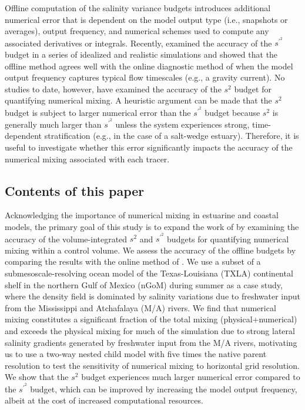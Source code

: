 \documentclass[draft]{agujournal2019}
\begin{document}
Offline computation of the salinity variance budgets introduces additional numerical error that is dependent on the model output type (i.e., snapshots or averages), output frequency, and numerical schemes used to compute any associated derivatives or integrals. Recently,  examined the accuracy of the $s^{\prime^2}$ budget in a series of idealized and realistic simulations and showed that the offline method agrees well with the online diagnostic method of  when the model output frequency captures typical flow timescales (e.g., a gravity current). No studies to date, however, have examined the accuracy of the $s^2$ budget for quantifying numerical mixing. A heuristic argument can be made that the $s^2$ budget is subject to larger numerical error than the $s^{\prime^2}$ budget because $s^2$ is generally much larger than $s^{\prime^2}$ unless the system experiences strong, time-dependent stratification (e.g., in the case of a salt-wedge estuary). Therefore, it is useful to investigate whether this error significantly impacts the accuracy of the numerical mixing associated with each tracer. 

\subsection{Contents of this paper}

Acknowledging the importance of numerical mixing in estuarine and coastal models, the primary goal of this study is to expand the work of  by examining the accuracy of the volume-integrated $s^2$ and $s^{\prime^2}$ budgets for quantifying numerical mixing within a control volume. We assess the accuracy of the offline budgets by comparing the results with the online method of . We use a subset of a submesoscale-resolving ocean model of the Texas-Louisiana (TXLA) continental shelf in the northern Gulf of Mexico (nGoM) during summer as a case study, where the density field is dominated by salinity variations due to freshwater input from the Mississippi and Atchafalaya (M/A) rivers. We find that numerical mixing constitutes a significant fraction of the total mixing (physical+numerical) and exceeds the physical mixing for much of the simulation due to strong lateral salinity gradients generated by freshwater input from the M/A rivers, motivating us to use a two-way nested child model with five times the native parent resolution to test the sensitivity of numerical mixing to horizontal grid resolution. We show that the $s^2$ budget experiences much larger numerical error compared to the $s^{\prime^2}$ budget, which can be improved by increasing the model output frequency, albeit at the cost of increased computational resources. 
\end{document}
